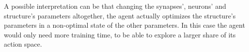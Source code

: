 A possible interpretation can be that changing the synapses', neurons' and structure's parameters altogether, the agent actually optimizes the structure's parameters in a non-optimal state of the other parameters. In this case the agent would only need more training time, to be able to explore a larger share of its action space. 

